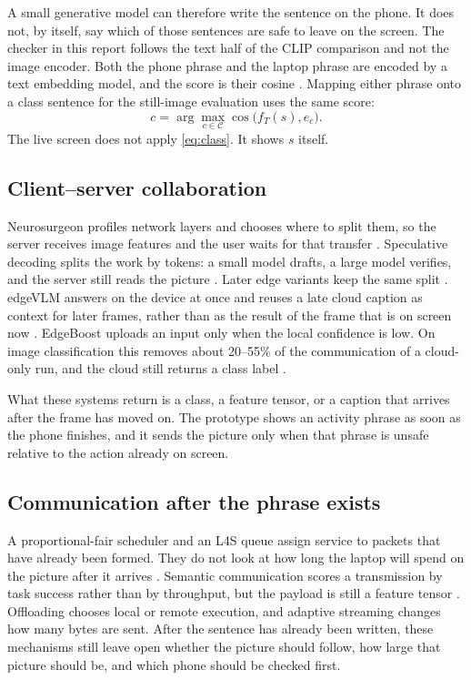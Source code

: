 A small generative model can therefore write the sentence on the phone. It
does not, by itself, say which of those sentences are safe to leave on the
screen. The checker in this report follows the text half of the CLIP
comparison and not the image encoder. Both the phone phrase and the laptop
phrase are encoded by a text embedding model, and the score is their cosine
\cite{xiao2024cpack}. Mapping either phrase onto a class sentence for the
still-image evaluation uses the same score:
\begin{equation}
\label{eq:class}
c
=
\arg\max_{c\in\mathcal{C}}
\cos\big(f_T(s), e_c\big).
\end{equation}
The live screen does not apply \eqref{eq:class}. It shows $s$ itself.

\subsection{Client--server collaboration}

Neurosurgeon profiles network layers and chooses where to split them, so
the server receives image features and the user waits for that transfer
\cite{kang2017neurosurgeon}. Speculative decoding splits the work by
tokens: a small model drafts, a large model verifies, and the server still
reads the picture \cite{leviathan2023fast,chen2023accelerating}. Later
edge variants keep the same split
\cite{jia2026covspec,venkatesha2025fast}. edgeVLM answers on the device at
once and reuses a late cloud caption as context for later frames, rather
than as the result of the frame that is on screen now
\cite{qian2025edgevlm}. EdgeBoost uploads an input only when the local
confidence is low. On image classification this removes about 20--55\% of
the communication of a cloud-only run, and the cloud still returns a class
label \cite{said2024edgeboost}.

What these systems return is a class, a feature tensor, or a caption that
arrives after the frame has moved on. The prototype shows an activity
phrase as soon as the phone finishes, and it sends the picture only when
that phrase is unsafe relative to the action already on screen.

\subsection{Communication after the phrase exists}

A proportional-fair scheduler and an L4S queue assign service to packets
that have already been formed. They do not look at how long the laptop will
spend on the picture after it arrives
\cite{jalali2000data,briscoe2023l4s}. Semantic communication scores a
transmission by task success rather than by throughput, but the payload is
still a feature tensor \cite{xie2021deep}. Offloading chooses local or
remote execution, and adaptive streaming changes how many bytes are sent.
After the sentence has already been written, these mechanisms still leave
open whether the picture should follow, how large that picture should be,
and which phone should be checked first.

